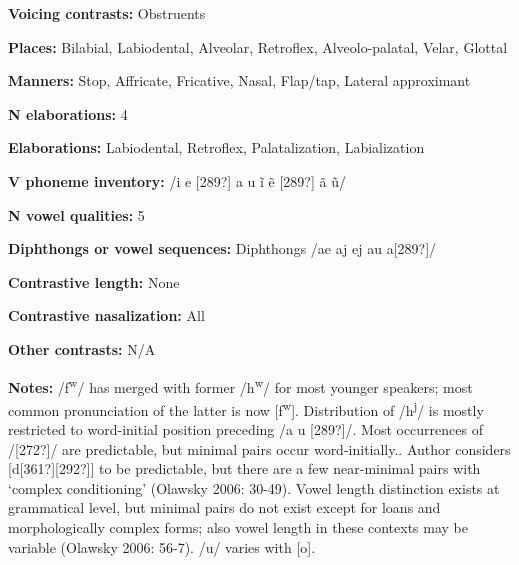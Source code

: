 \begin{styleBody}
\textbf{Voicing contrasts:} Obstruents
\end{styleBody}

\begin{styleBody}
\textbf{Places:} Bilabial, Labiodental, Alveolar, Retroflex, Alveolo-palatal, Velar, Glottal
\end{styleBody}

\begin{styleBody}
\textbf{Manners:} Stop, Affricate, Fricative, Nasal, Flap/tap, Lateral approximant
\end{styleBody}

\begin{styleBody}
\textbf{N elaborations:} 4
\end{styleBody}

\begin{styleBody}
\textbf{Elaborations:} Labiodental, Retroflex, Palatalization, Labialization
\end{styleBody}

\begin{styleBody}
\textbf{V phoneme inventory:} /i e [289?] a u \~{i} \~{e} [289?] \~{a} \~{u}/
\end{styleBody}

\begin{styleBody}
\textbf{N vowel qualities:} 5
\end{styleBody}

\begin{styleBody}
\textbf{Diphthongs or vowel sequences:} Diphthongs /ae aj ej au a[289?]/
\end{styleBody}

\begin{styleBody}
\textbf{Contrastive length:} None
\end{styleBody}

\begin{styleBody}
\textbf{Contrastive nasalization:} All
\end{styleBody}

\begin{styleBody}
\textbf{Other contrasts:} N/A
\end{styleBody}

\begin{styleBody}
\textbf{Notes:} /f\textsuperscript{w}/ has merged with former /h\textsuperscript{w}/ for most younger speakers; most common pronunciation of the latter is now [f\textsuperscript{w}]. Distribution of /h\textsuperscript{j}/ is mostly restricted to word-initial position preceding /a u [289?]/. Most occurrences of /[272?]/ are predictable, but minimal pairs occur word-initially.. Author considers [d[361?][292?]] to be predictable, but there are a few near-minimal pairs with ‘complex conditioning’ (Olawsky 2006: 30-49). Vowel length distinction exists at grammatical level, but minimal pairs do not exist except for loans and morphologically complex forms; also vowel length in these contexts may be variable (Olawsky 2006: 56-7). /u/ varies with [o].
\end{styleBody}

